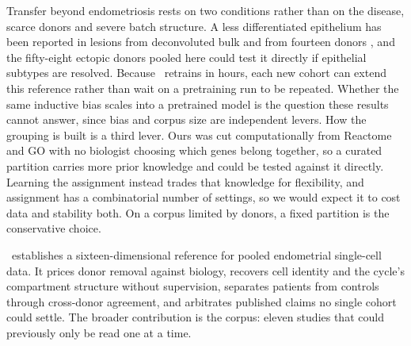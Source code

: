 Transfer beyond endometriosis rests on two conditions rather than on the
disease, scarce donors and severe batch structure. A less differentiated 
epithelium has been reported in lesions from deconvoluted bulk and from 
fourteen donors \citep{garciaalonso2021endometrium,tan2022singlecell}, and 
the fifty-eight ectopic donors pooled here could test it directly if 
epithelial subtypes are resolved. Because \elaj\ retrains in hours, each 
new cohort can extend this reference rather than wait on a pretraining run 
to be repeated. Whether the same inductive bias scales into a pretrained 
model is the question these results cannot answer, since bias and corpus 
size are independent levers. How the grouping is built is a third lever. Ours was cut
computationally from Reactome and GO with no biologist choosing which genes
belong together, so a curated partition carries more prior knowledge and
could be tested against it directly. Learning the assignment instead trades
that knowledge for flexibility, and assignment has a combinatorial number of
settings, so we would expect it to cost data and stability both. On a corpus
limited by donors, a fixed partition is the conservative choice.

\elaj\ establishes a sixteen-dimensional reference for pooled endometrial
single-cell data. It prices donor removal against biology, recovers cell
identity and the cycle's compartment structure without supervision, separates patients
from controls through cross-donor agreement, and arbitrates published claims no single
cohort could settle. The broader contribution is the corpus: eleven studies 
that could previously only be read one at a time.

